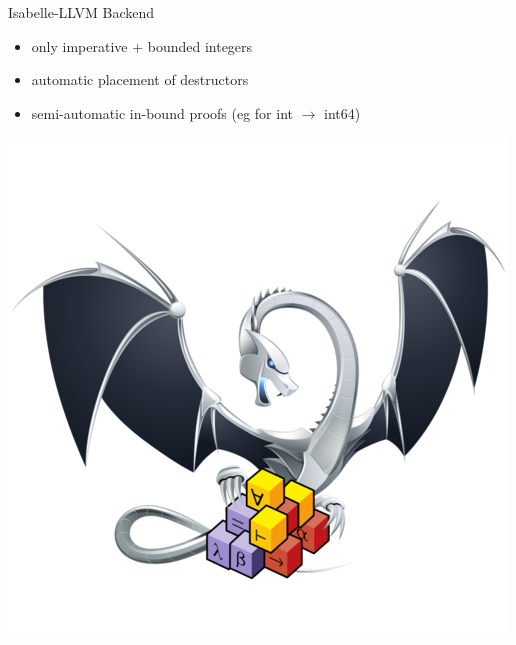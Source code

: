 \documentclass[fleqn]{beamer}
\begin{document}
\begin{frame}{Isabelle-LLVM Backend}
  \begin{itemize}
   \item only imperative + bounded integers
   \item automatic placement of destructors
   \item semi-automatic in-bound proofs (eg for int $\to$ int64)

  \end{itemize}
  \includegraphics[height=.5\textheight]{isabelle-llvm.png}

\end{frame}
\end{document}
